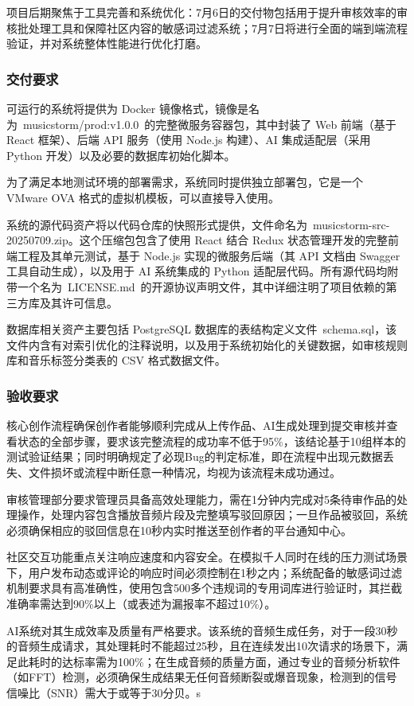 \documentclass{base}
\begin{document}
项目后期聚焦于工具完善和系统优化：7月6日的交付物包括用于提升审核效率的审核批处理工具和保障社区内容的敏感词过滤系统；7月7日将进行全面的端到端流程验证，并对系统整体性能进行优化打磨。

\subsubsection{交付要求}
可运行的系统将提供为 Docker 镜像格式，镜像是名为 musicstorm/prod:v1.0.0 的完整微服务容器包，其中封装了 Web 前端（基于 React 框架）、后端 API 服务（使用 Node.js 构建）、AI 集成适配层（采用 Python 开发）以及必要的数据库初始化脚本。

为了满足本地测试环境的部署需求，系统同时提供独立部署包，它是一个 VMware OVA 格式的虚拟机模板，可以直接导入使用。

系统的源代码资产将以代码仓库的快照形式提供，文件命名为 musicstorm-src-20250709.zip。这个压缩包包含了使用 React 结合 Redux 状态管理开发的完整前端工程及其单元测试，基于 Node.js 实现的微服务后端（其 API 文档由 Swagger 工具自动生成），以及用于 AI 系统集成的 Python 适配层代码。所有源代码均附带一个名为 LICENSE.md 的开源协议声明文件，其中详细注明了项目依赖的第三方库及其许可信息。

数据库相关资产主要包括 PostgreSQL 数据库的表结构定义文件 schema.sql，该文件内含有对索引优化的注释说明，以及用于系统初始化的关键数据，如审核规则库和音乐标签分类表的 CSV 格式数据文件。

\subsubsection{验收要求}

核心创作流程确保创作者能够顺利完成从上传作品、AI生成处理到提交审核并查看状态的全部步骤，要求该完整流程的成功率不低于95\%，该结论基于10组样本的测试验证结果；同时明确规定了必现Bug的判定标准，即在流程中出现元数据丢失、文件损坏或流程中断任意一种情况，均视为该流程未成功通过。

审核管理部分要求管理员具备高效处理能力，需在1分钟内完成对5条待审作品的处理操作，处理内容包含播放音频片段及完整填写驳回原因；一旦作品被驳回，系统必须确保相应的驳回信息在10秒内实时推送至创作者的平台通知中心。

社区交互功能重点关注响应速度和内容安全。在模拟千人同时在线的压力测试场景下，用户发布动态或评论的响应时间必须控制在1秒之内；系统配备的敏感词过滤机制要求具有高准确性，使用包含500多个违规词的专用词库进行验证时，其拦截准确率需达到90\%以上（或表述为漏报率不超过10\%）。

AI系统对其生成效率及质量有严格要求。该系统的音频生成任务，对于一段30秒的音频生成请求，其处理耗时不能超过25秒，且在连续发出10次请求的场景下，满足此耗时的达标率需为100\%；在生成音频的质量方面，通过专业的音频分析软件（如FFT）检测，必须确保生成结果无任何音频断裂或爆音现象，检测到的信号信噪比（SNR）需大于或等于30分贝。s
\end{document}
